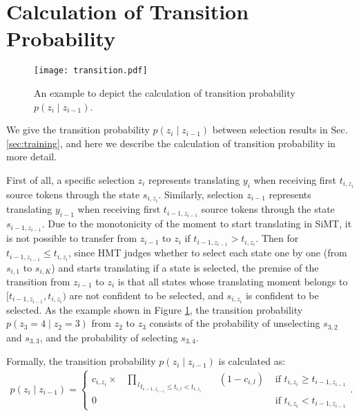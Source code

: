 \documentclass{article} %
\begin{document}
\section{Calculation of Transition Probability}
\label{sec:transition}

\begin{figure}[h]
    \centering
    \texttt{[image: transition.pdf]}
    \caption{An example to depict the calculation of transition probability $p\!\left ( z_{i}\mid z_{i-1}  \right )$. }
    \label{fig:transition}
\end{figure}

We give the transition probability $p\!\left ( z_{i}\mid z_{i-1}  \right )$ between selection results in Sec.\ref{sec:training}, and here we describe the calculation of transition probability in more detail.

First of all, a specific selection $z_{i}$ represents translating $y_{i}$ when receiving first $t_{i,z_{i}}$ source tokens through the state $s_{i,z_{i}}$. Similarly, selection $z_{i-1}$ represents translating $y_{i-1}$ when receiving first $t_{i-1,z_{i-1}}$ source tokens through the state $s_{i-1,z_{i-1}}$. Due to the monotonicity of the moment to start translating in SiMT, it is not possible to transfer from $z_{i-1}$ to $z_{i}$ if $t_{i-1,z_{i-1}}>t_{i,z_{i}}$. Then for $t_{i-1,z_{i-1}}\leq t_{i,z_{i}}$, since HMT judges whether to select each state one by one (from $s_{i,1}$ to $s_{i,K}$) and starts translating if a state is selected, the premise of the transition from $z_{i-1}$ to $z_{i}$ is that all states whose translating moment belongs to $[t_{i-1,z_{i-1}}, t_{i,z_{i}})$ are not confident to be selected, and $s_{i,z_{i}}$ is confident to be selected. As the example shown in Figure \ref{fig:transition}, the transition probability $p\!\left ( z_{3}=4\mid z_{2}=3  \right )$ from $z_{2}$ to $z_{3}$ consists of the probability of unselecting $s_{3,2}$ and $s_{3,3}$, and the probability of selecting $s_{3,4}$. 

Formally, the transition probability $p\!\left ( z_{i}\mid z_{i-1}  \right )$ is calculated as:
\begin{gather}
    p\!\left ( z_{i}\mid z_{i-1}  \right )=\begin{cases}
c_{i,z_{i}}\times \;\;\; \underset{t_{i-1,z_{i-1}}\leq t_{i,l}<t_{i,z_{i}}\;\;\;\;\;\;\;\;}{\prod_{\,l}} \!\!\!\!\!\!\!\!\!\!\!\left ( 1\!-\!c_{i,l} \right )& \text{ if } t_{i,z_{i}}\geq  t_{i-1,z_{i-1}} \\
0 & \text{ if } t_{i,z_{i}}< t_{i-1,z_{i-1}}
\end{cases}.
\end{gather}
\end{document}
